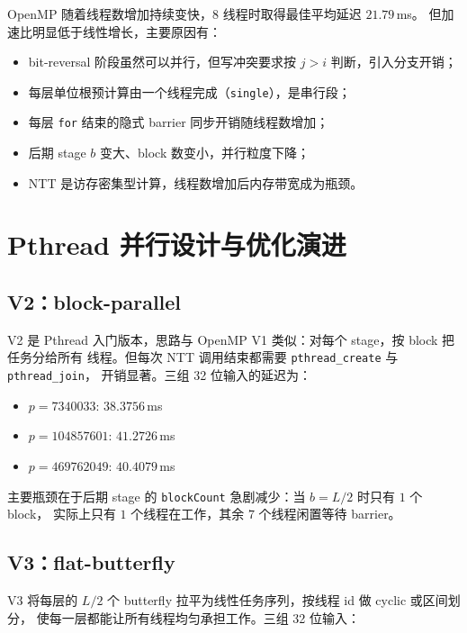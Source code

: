 \documentclass[UTF8,a4paper,10pt]{ctexart}
\begin{document}
OpenMP 随着线程数增加持续变快，8 线程时取得最佳平均延迟 $21.79$\,ms。
但加速比明显低于线性增长，主要原因有：

\begin{itemize}
  \item bit-reversal 阶段虽然可以并行，但写冲突要求按 $j > i$ 判断，引入分支开销；
  \item 每层单位根预计算由一个线程完成（\texttt{single}），是串行段；
  \item 每层 \texttt{for} 结束的隐式 barrier 同步开销随线程数增加；
  \item 后期 stage $b$ 变大、block 数变小，并行粒度下降；
  \item NTT 是访存密集型计算，线程数增加后内存带宽成为瓶颈。
\end{itemize}

\section{Pthread 并行设计与优化演进}

\subsection{V2：block-parallel}

V2 是 Pthread 入门版本，思路与 OpenMP V1 类似：对每个 stage，按 block 把任务分给所有
线程。但每次 NTT 调用结束都需要 \texttt{pthread\_create} 与 \texttt{pthread\_join}，
开销显著。三组 32 位输入的延迟为：

\begin{itemize}
  \item $p = 7340033$: $38.3756$\,ms
  \item $p = 104857601$: $41.2726$\,ms
  \item $p = 469762049$: $40.4079$\,ms
\end{itemize}

主要瓶颈在于后期 stage 的 \texttt{blockCount} 急剧减少：当 $b = L/2$ 时只有 $1$ 个 block，
实际上只有 $1$ 个线程在工作，其余 $7$ 个线程闲置等待 barrier。

\subsection{V3：flat-butterfly}

V3 将每层的 $L/2$ 个 butterfly 拉平为线性任务序列，按线程 id 做 cyclic 或区间划分，
使每一层都能让所有线程均匀承担工作。三组 32 位输入：
\end{document}
